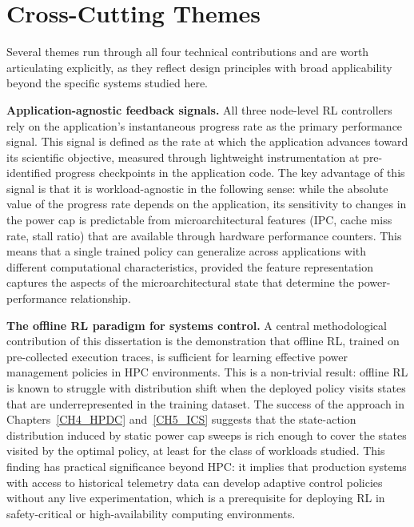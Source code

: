 \section{Cross-Cutting Themes}

Several themes run through all four technical contributions and are worth articulating
explicitly, as they reflect design principles with broad applicability beyond the
specific systems studied here.

\textbf{Application-agnostic feedback signals.}
All three node-level RL controllers rely on the application's instantaneous progress
rate as the primary performance signal.
This signal is defined as the rate at which the application advances toward its
scientific objective, measured through lightweight instrumentation at pre-identified
progress checkpoints in the application code.
The key advantage of this signal is that it is workload-agnostic in the following sense:
while the absolute value of the progress rate depends on the application, its
sensitivity to changes in the power cap is predictable from microarchitectural features
(IPC, cache miss rate, stall ratio) that are available through hardware performance
counters.
This means that a single trained policy can generalize across applications with
different computational characteristics, provided the feature representation captures
the aspects of the microarchitectural state that determine the power-performance
relationship.

\textbf{The offline RL paradigm for systems control.}
A central methodological contribution of this dissertation is the demonstration that
offline RL, trained on pre-collected execution traces, is sufficient for learning
effective power management policies in HPC environments.
This is a non-trivial result: offline RL is known to struggle with distribution shift
when the deployed policy visits states that are underrepresented in the training dataset.
The success of the approach in Chapters~\ref{CH4_HPDC} and~\ref{CH5_ICS} suggests that
the state-action distribution induced by static power cap sweeps is rich enough to
cover the states visited by the optimal policy, at least for the class of workloads
studied.
This finding has practical significance beyond HPC: it implies that production systems
with access to historical telemetry data can develop adaptive control policies without
any live experimentation, which is a prerequisite for deploying RL in safety-critical
or high-availability computing environments.

